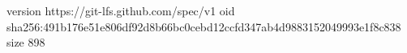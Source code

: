 version https://git-lfs.github.com/spec/v1
oid sha256:491b176e51e806df92d8b66bc0cebd12ccfd347ab4d9883152049993e1f8c838
size 898

